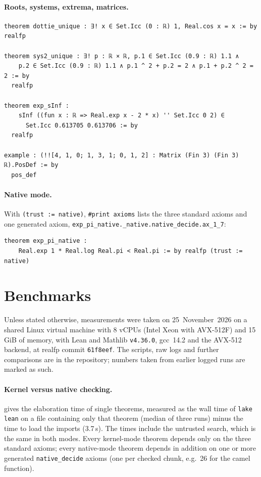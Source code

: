 \documentclass[11pt]{article}
\theoremstyle{definition}
\theoremstyle{remark}
\newcommand{\lean}[1]{\texttt{#1}}
\newcommand{\realfp}{\textsf{realfp}}
\begin{document}
\paragraph{Roots, systems, extrema, matrices.}
\begin{lstlisting}
theorem dottie_unique : ∃! x ∈ Set.Icc (0 : ℝ) 1, Real.cos x = x := by realfp

theorem sys2_unique : ∃! p : ℝ × ℝ, p.1 ∈ Set.Icc (0.9 : ℝ) 1.1 ∧
    p.2 ∈ Set.Icc (0.9 : ℝ) 1.1 ∧ p.1 ^ 2 + p.2 = 2 ∧ p.1 + p.2 ^ 2 = 2 := by
  realfp

theorem exp_sInf :
    sInf ((fun x : ℝ => Real.exp x - 2 * x) '' Set.Icc 0 2) ∈
      Set.Icc 0.613705 0.613706 := by
  realfp

example : (!![4, 1, 0; 1, 3, 1; 0, 1, 2] : Matrix (Fin 3) (Fin 3) ℝ).PosDef := by
  pos_def
\end{lstlisting}

\paragraph{Native mode.} With \lean{(trust := native)}, \lean{\#print axioms}
lists the three standard axioms and one generated axiom,
\lean{exp\_pi\_native.\_native.\allowbreak native\_decide.ax\_1\_7}:
\begin{lstlisting}
theorem exp_pi_native :
    Real.exp 1 * Real.log Real.pi < Real.pi := by realfp (trust := native)
\end{lstlisting}

\section{Benchmarks}\label{sec:bench}

Unless stated otherwise, measurements were taken on 25~November~2026 on a
shared Linux virtual machine with 8 vCPUs (Intel Xeon with AVX-512F) and
15\,GiB of memory, with Lean and Mathlib \lean{v4.36.0}, gcc~14.2 and the
AVX-512 backend, at \realfp{} commit \lean{61f8eef}. The scripts, raw logs
and further comparisons are in the repository; numbers taken from earlier
logged runs are marked as such.

\paragraph{Kernel versus native checking.}
 gives the elaboration time of single theorems, measured as
the wall time of \lean{lake lean} on a file containing only that theorem
(median of three runs) minus the time to load the imports (3.7\,s). The
times include the untrusted search, which is the same in both modes. Every
kernel-mode theorem depends only on the three standard axioms; every
native-mode theorem depends in addition on one or more generated
\lean{native\_decide} axioms (one per checked chunk, e.g.\ 26 for the camel
function).
\end{document}
